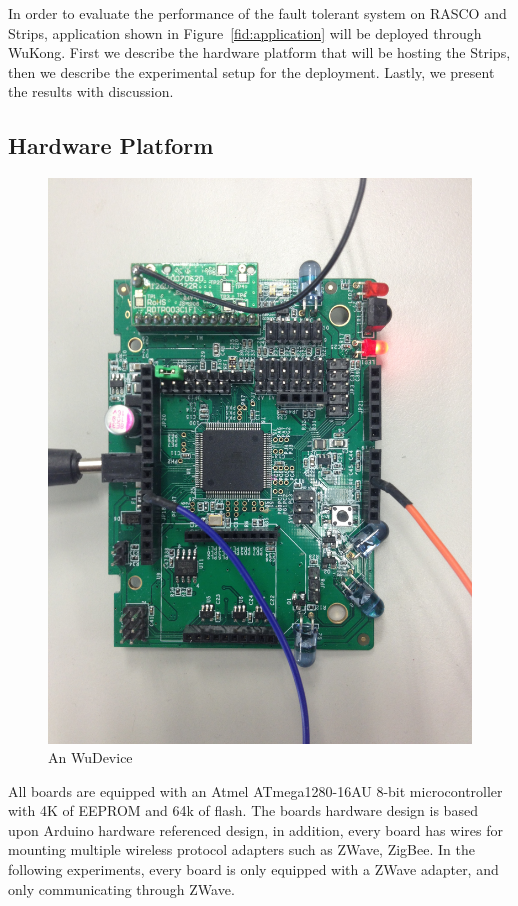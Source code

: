 In order to evaluate the performance of the fault tolerant system on RASCO and Strips, application shown in Figure~\ref{fid:application} will be deployed through WuKong. First we describe the hardware platform that will be hosting the Strips, then we describe the experimental setup for the deployment. Lastly, we present the results with discussion.

\subsection{Hardware Platform}

\begin{figure}[h!]
\caption{An WuDevice}
\label{fig:wudevice}
\centering
    \includegraphics[width=\linewidth]{figures/wudevice}
\end{figure}

All boards are equipped with an Atmel ATmega1280-16AU 8-bit microcontroller with 4K of EEPROM and 64k of flash. The boards hardware design is based upon Arduino hardware referenced design, in addition, every board has wires for mounting multiple wireless protocol adapters such as ZWave, ZigBee. In the following experiments, every board is only equipped with a ZWave adapter, and only communicating through ZWave. 

